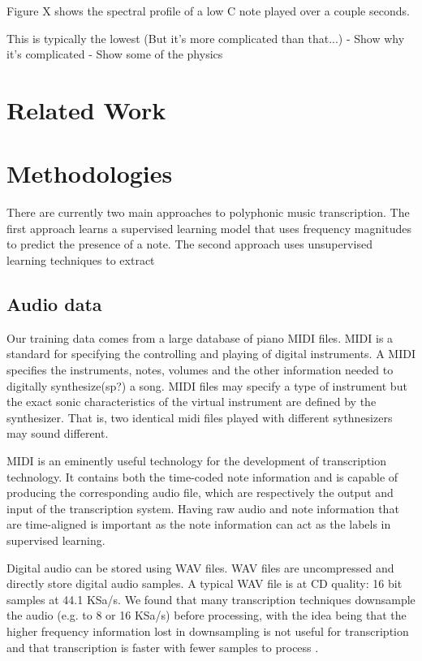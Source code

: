 \documentclass[5p]{elsarticle}
\begin{document}
Figure X shows the spectral profile of a low C note played over a couple seconds. 

This is typically the lowest 
(But it's more complicated than that...)
- Show why it's complicated 
- Show some of the physics 


\section{Related Work}


\section{Methodologies}
There are currently two main approaches to polyphonic music transcription. The first approach learns a supervised learning model that uses frequency magnitudes to predict the presence of a note. The second approach uses unsupervised learning techniques to extract

\subsection{Audio data}
Our training data comes from a large database of piano MIDI files. MIDI is a standard for specifying the controlling and playing of digital instruments. A MIDI specifies the instruments, notes, volumes and the other information needed to digitally synthesize(sp?) a song. MIDI files may specify a type of instrument but the exact sonic characteristics of the virtual instrument are defined by the synthesizer. That is, two identical midi files played with different sythnesizers may sound different.

MIDI is an eminently useful technology for the development of transcription technology. It contains both the time-coded note information and is capable of producing the corresponding audio file, which are respectively the output and input of the transcription system. Having raw audio and note information that are time-aligned is important as the note information can act as the labels in supervised learning.

Digital audio can be stored using WAV files. WAV files are uncompressed and directly store digital audio samples. A typical WAV file is at CD quality: 16 bit samples at 44.1 KSa/s. We found that many transcription techniques downsample the audio (e.g. to 8 or 16 KSa/s) before processing, with the idea being that the higher frequency information lost in downsampling is not useful for transcription and that transcription is faster with fewer samples to process \citet{}.
\end{document}
